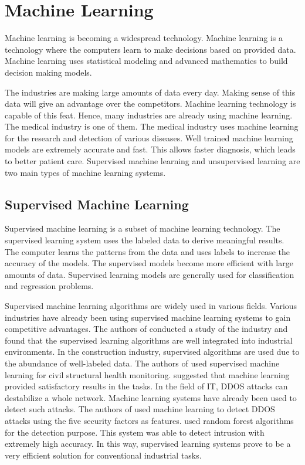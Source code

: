 \newpage
\section{Machine Learning}\label{sec:machine_learning}

Machine learning is becoming a widespread technology. Machine learning is a technology where the computers learn to make decisions based on provided data. Machine learning uses statistical modeling and advanced mathematics to build decision making models.

The industries are making large amounts of data every day. Making sense of this data will give an advantage over the competitors. Machine learning technology is capable of this feat. Hence, many industries are already using machine learning. The medical industry is one of them. The medical industry uses machine learning for the research and detection of various diseases. Well trained machine learning models are extremely accurate and fast. This allows faster diagnosis, which leads to better patient care. Supervised machine learning and unsupervised learning are two main types of machine learning systems.

\subsection{Supervised Machine Learning}\label{subsec:supervised_machine_learning}

Supervised machine learning is a subset of machine learning technology. The supervised learning system uses the labeled data to derive meaningful results. The computer learns the patterns from the data and uses labels to increase the accuracy of the models. The supervised models become more efficient with large amounts of data. Supervised learning models are generally used for classification and regression problems.

Supervised machine learning algorithms are widely used in various fields. Various industries have already been using supervised machine learning systems to gain competitive advantages. The authors of \cite{ref_paper_14} conducted a study of the industry and found that the supervised learning algorithms are well integrated into industrial environments. In the construction industry, supervised algorithms are used due to the abundance of well-labeled data. The authors of \cite{ref_paper_6} used supervised machine learning for civil structural health monitoring. \citeauthor{ref_paper_6} suggested that machine learning provided satisfactory results in the tasks. In the field of IT, DDOS attacks can destabilize a whole network. Machine learning systems have already been used to detect such attacks. The authors of \cite{ref_paper_9} used machine learning to detect DDOS attacks using the five security factors as features. \citeauthor{ref_paper_9} used random forest algorithms for the detection purpose. This system was able to detect intrusion with extremely high accuracy. In this way, supervised learning systems prove to be a very efficient solution for conventional industrial tasks.

